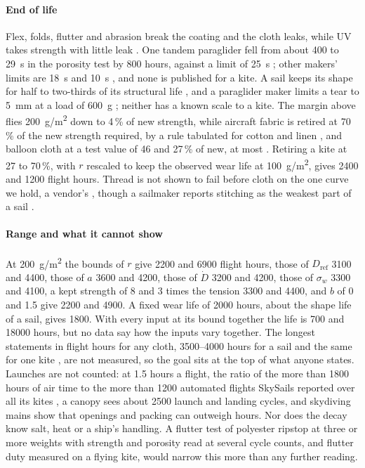 \paragraph{End of life} Flex, folds, flutter and abrasion break the coating and the cloth leaks, while UV takes strength with little leak \citep{maslanka2023,maslanka2023thesis}. One tandem paraglider fell from about 400 to \SI{29}{s} in the porosity test by 800 hours, against a limit of \SI{25}{s} \citep{supair2016}; other makers' limits are \SI{18}{s} \citep{dudek2026} and \SI{10}{s} \citep{bgd2026}, and none is published for a kite. A sail keeps its shape for half to two-thirds of its structural life \citep{flynn2015}, and a paraglider maker limits a tear to \SI{5}{mm} at a load of \SI{600}{g} \citep{bgd2026}; neither has a known scale to a kite. The margin above flies \SI{200}{g/m^2} down to 4\,\% of new strength, while aircraft fabric is retired at 70\,\% of the new strength required, by a rule tabulated for cotton and linen \citep{faa2001}, and balloon cloth at a test value of 46 and 27\,\% of new, at most \citep{lindstrand_mm}. Retiring a kite at 27 to 70\,\%, with $r$ rescaled to keep the observed wear life at \SI{100}{g/m^2}, gives \num{2400} and \num{1200} flight hours. Thread is not shown to fail before cloth on the one curve we hold, a vendor's \citep{shippee2016}, though a sailmaker reports stitching as the weakest part of a sail \citep{gifford2014}.

\paragraph{Range and what it cannot show} At \SI{200}{g/m^2} the bounds of $r$ give \num{2200} and \num{6900} flight hours, those of $D_\mathrm{ref}$ \num{3100} and \num{4400}, those of $a$ \num{3600} and \num{4200}, those of $\dot D$ \num{3200} and \num{4200}, those of $\sigma_w$ \num{3300} and \num{4100}, a kept strength of 8 and 3 times the tension \num{3300} and \num{4400}, and $b$ of 0 and 1.5 give \num{2200} and \num{4900}. A fixed wear life of \num{2000} hours, about the shape life of a sail, gives \num{1800}. With every input at its bound together the life is \num{700} and \num{18000} hours, but no data say how the inputs vary together. The longest statements in flight hours for any cloth, \numrange{3500}{4000} hours for a sail \citep{flynn2015} and the same for one kite \citep{kitepower2024}, are not measured, so the goal sits at the top of what anyone states. Launches are not counted: at 1.5 hours a flight, the ratio of the more than \num{1800} hours of air time to the more than \num{1200} automated flights SkySails reported over all its kites \citep{skysails2018}, a canopy sees about \num{2500} launch and landing cycles, and skydiving mains show that openings and packing can outweigh hours. Nor does the decay know salt, heat or a ship's handling. A flutter test of polyester ripstop at three or more weights with strength and porosity read at several cycle counts, and flutter duty measured on a flying kite, would narrow this more than any further reading.

